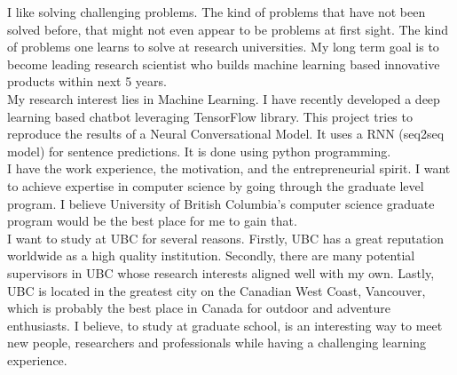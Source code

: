 \documentclass{article}
\begin{document}
I like solving challenging problems. The kind of problems that have not been solved before, that might not even appear to be problems at first sight. The kind of problems one learns to solve at research universities. My long term goal is to become leading research scientist who builds machine learning based innovative products within next 5 years.\\

My research interest lies in Machine Learning. I have recently developed a deep learning based chatbot leveraging TensorFlow library. This project tries to reproduce the results of a Neural Conversational Model. It uses a RNN (seq2seq model) for sentence predictions. It is done using python programming.\\

I have the work experience, the motivation, and the entrepreneurial spirit. I want to achieve expertise in computer science by going through the graduate level program. I believe University of British Columbia’s computer science graduate program would be the best place for me to gain that.\\

I want to study at UBC for several reasons. Firstly, UBC has a great reputation worldwide as a high quality institution. Secondly, there are many potential supervisors in UBC whose research interests aligned well with my own. Lastly, UBC is located in the greatest city on the Canadian West Coast, Vancouver, which is probably the best place in Canada for outdoor and adventure enthusiasts. I believe, to study at graduate school, is an interesting way to meet new people, researchers and professionals while having a challenging learning experience.\\

  
\end{document}
